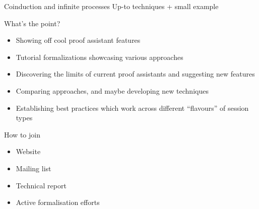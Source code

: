 \documentclass[aspectratio=169,hyperref={pdfpagelabels=false}]{beamer}
\begin{document}
\begin{frame}{Coinduction and infinite processes}
  Up-to techniques + small example
\end{frame}

\begin{frame}{What's the point?}
  \begin{itemize}
  \item Showing off cool proof assistant features
  \item Tutorial formalizations showcasing various approaches
  \item Discovering the limits of current proof assistants and suggesting new features
  \item Comparing approaches, and maybe developing new techniques
  \item Establishing best practices which work across different ``flavours'' of session types
  \end{itemize}
\end{frame}

\begin{frame}{How to join}
  \begin{itemize}
  \item Website
  \item Mailing list
  \item Technical report
  \item Active formalisation efforts
  \end{itemize}
\end{frame}
\end{document}
